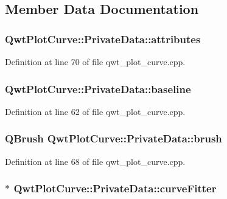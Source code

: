 \subsection{Member Data Documentation}
\hypertarget{class_qwt_plot_curve_1_1_private_data_afb3b0b97979b35d6b42ce24de7b5bf43}{
\subsubsection[{attributes}]{ Qwt\-Plot\-Curve\-::\-Private\-Data\-::attributes}}\label{class_qwt_plot_curve_1_1_private_data_afb3b0b97979b35d6b42ce24de7b5bf43}


Definition at line 70 of file qwt\-\_\-plot\-\_\-curve.\-cpp.

\hypertarget{class_qwt_plot_curve_1_1_private_data_a9af3eeea01bcb3704f83664cc35b4133}{
\subsubsection[{baseline}]{ Qwt\-Plot\-Curve\-::\-Private\-Data\-::baseline}}\label{class_qwt_plot_curve_1_1_private_data_a9af3eeea01bcb3704f83664cc35b4133}


Definition at line 62 of file qwt\-\_\-plot\-\_\-curve.\-cpp.

\hypertarget{class_qwt_plot_curve_1_1_private_data_aa38b83df97e5b5e3cfe9df50a3aeb809}{
\subsubsection[{brush}]{\setlength{\rightskip}{0pt plus 5cm}Q\-Brush Qwt\-Plot\-Curve\-::\-Private\-Data\-::brush}}\label{class_qwt_plot_curve_1_1_private_data_aa38b83df97e5b5e3cfe9df50a3aeb809}


Definition at line 68 of file qwt\-\_\-plot\-\_\-curve.\-cpp.

\hypertarget{class_qwt_plot_curve_1_1_private_data_af159f65bd5e80e4683960cc2e770dc68}{
\subsubsection[{curve\-Fitter}]{$\ast$ Qwt\-Plot\-Curve\-::\-Private\-Data\-::curve\-Fitter}}\label{class_qwt_plot_curve_1_1_private_data_af159f65bd5e80e4683960cc2e770dc68}


